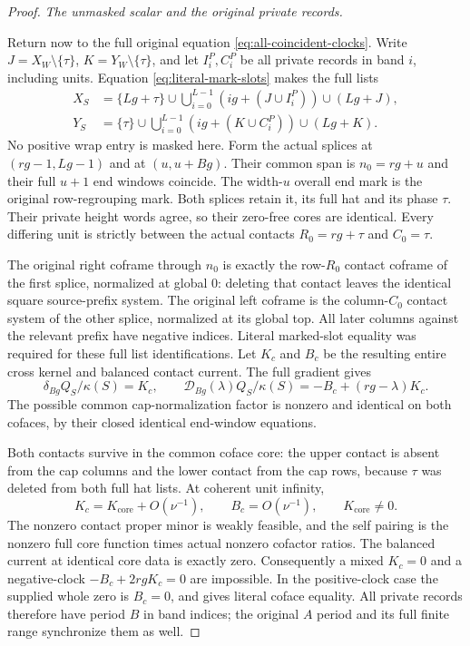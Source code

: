 \documentclass[11pt,a4paper]{amsart}
\numberwithin{equation}{section}
\theoremstyle{plain}
\theoremstyle{definition}
\newcommand{\DD}{\mathscr D}
\begin{document}
\begin{proof}
\smallskip
\noindent\emph{The unmasked scalar and the original private records.}

Return now to the full original equation \eqref{eq:all-coincident-clocks}.
Write \(J=X_W\setminus\{\tau\}\), \(K=Y_W\setminus\{\tau\}\), and let
\(I_i^P,C_i^P\) be all private records in band \(i\), including units.
Equation \eqref{eq:literal-mark-slots} makes the full lists
\begin{equation}\label{eq:coincident-full-flags}
 \begin{aligned}
 X_S&=\{Lg+\tau\}\cup
     \bigcup_{i=0}^{L-1}(ig+(J\cup I_i^P))\cup(Lg+J),\\
 Y_S&=\{\tau\}\cup
     \bigcup_{i=0}^{L-1}(ig+(K\cup C_i^P))\cup(Lg+K).
 \end{aligned}
\end{equation}
No positive wrap entry is masked here.
Form the actual splices at \((rg-1,Lg-1)\) and at \((u,u+Bg)\).
Their common span is \(n_0=rg+u\) and their full \(u+1\) end windows coincide.
The width-\(u\) overall end mark is the original row-regrouping mark.
Both splices retain it, its full hat and its phase \(\tau\).
Their private height words agree, so their zero-free cores are identical.
Every differing unit is strictly between the actual contacts
\(R_0=rg+\tau\) and \(C_0=\tau\).

The original right coframe through \(n_0\) is exactly the row-\(R_0\) contact
coframe of the first splice, normalized at global \(0\): deleting that
contact leaves the identical square source-prefix system.  The original
left coframe is the column-\(C_0\) contact system of the other splice,
normalized at its global top.  All later columns against the relevant
prefix have negative indices.  Literal marked-slot equality was required
for these full list identifications.
Let \(K_c\) and \(B_c\) be the resulting entire cross kernel and balanced
contact current.  The full gradient gives
\[
 \delta_{Bg}Q_S/\kappa(S)=K_c,\qquad
 \DD_{Bg}(\lambda)Q_S/\kappa(S)
              =-B_c+(rg-\lambda)K_c.
\]
The possible common cap-normalization factor is nonzero and identical on
both cofaces, by their closed identical end-window equations.

Both contacts survive in the common coface core: the upper contact is
absent from the cap columns and the lower contact from the cap rows,
because \(\tau\) was deleted from both full hat lists.  At coherent unit
infinity,
\[
 K_c=K_{\mathrm{core}}+O(\nu^{-1}),\qquad
 B_c=O(\nu^{-1}),\qquad K_{\mathrm{core}}\ne0.
\]
The nonzero contact proper minor is weakly feasible, and the self pairing
is the nonzero full core function times actual nonzero cofactor ratios.
The balanced current at identical core data is exactly zero.
Consequently a mixed \(K_c=0\) and a negative-clock
\(-B_c+2rgK_c=0\) are impossible.  In the positive-clock case the supplied
whole zero is \(B_c=0\), and  gives literal
coface equality.  All private records therefore have period \(B\) in band
indices; the original \(A\) period and its full finite range synchronize
them as well.


\end{proof}
\end{document}
